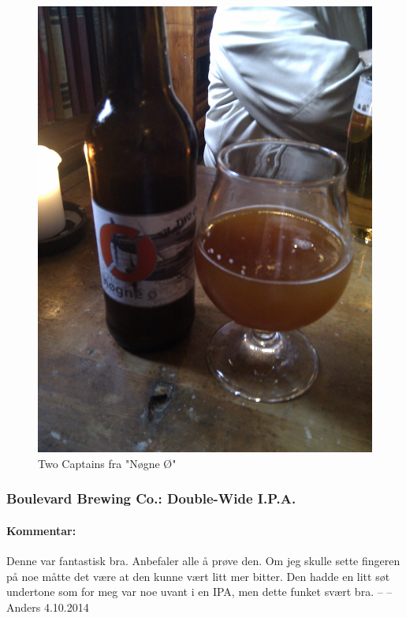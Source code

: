 \documentclass[12pt,a4paper,oneside,norsk]{article}
\begin{document}
\begin{figure} [H]
\centering
\includegraphics[scale=0.1, angle=0]{Bilder/Ol/twoCpt.jpg}
\caption{Two Captains fra "Nøgne Ø"}
\end{figure}

\newpage
\subsubsection{Boulevard Brewing Co.: Double-Wide I.P.A.}
\paragraph{Kommentar:} Denne var fantastisk bra. Anbefaler alle å prøve den. Om jeg skulle sette fingeren på noe måtte det være at den kunne vært litt mer bitter. Den hadde en litt søt undertone som for meg var noe uvant i en IPA, men dette funket svært bra.
\newline
-- -- Anders 4.10.2014
\end{document}
